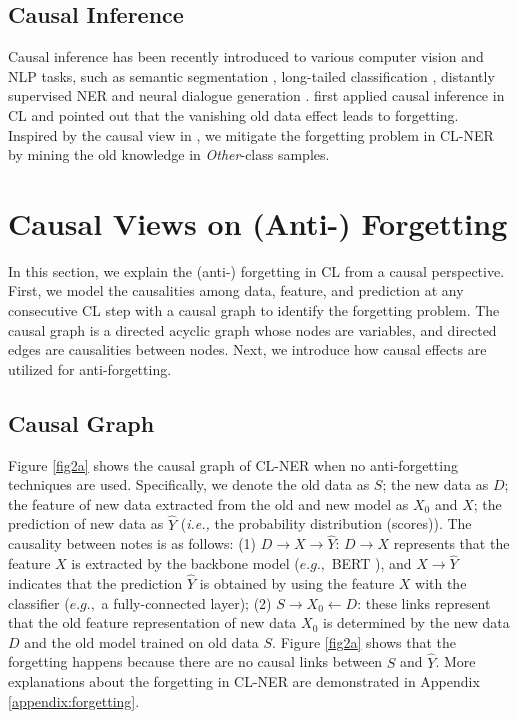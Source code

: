 \documentclass[11pt]{article}
\begin{document}
\subsection{Causal Inference}
Causal inference \citep{glymour2016causal,scholkopf2022causality} has been recently introduced to various computer vision and NLP tasks, such as semantic segmentation \citep{zhang2020causal}, long-tailed classification \citep{tang2020long,nan2021uncovering}, distantly supervised NER \citep{zhang2021biasing} and neural dialogue generation \citep{zhu2020counterfactual}.
\citet{hu2021distilling} first applied causal inference in CL and pointed out that the vanishing old data effect leads to forgetting.
Inspired by the causal view in \citep{hu2021distilling}, we mitigate the forgetting problem in CL-NER by mining the old knowledge in \textit{Other}-class samples.

\section{Causal Views on (Anti-) Forgetting}
In this section, we explain the (anti-) forgetting in CL from a causal perspective.
First, we model the causalities among data, feature, and prediction at any consecutive CL step with a causal graph \citep{pearl2009causality} to identify the forgetting problem.
The causal graph is a directed acyclic graph whose nodes are variables, and directed edges are causalities between nodes.
Next, we introduce how causal effects are utilized for anti-forgetting.

\subsection{Causal Graph}
Figure \ref{fig2a} shows the causal graph of CL-NER when no anti-forgetting techniques are used.
Specifically, we denote the old data as $S$; the new data as $D$; the feature of new data extracted from the old and new model as $X_0$ and $X$; the prediction of new data as $\hat{Y}$ (\textit{i.e.,} the probability distribution (scores)).
The causality between notes is as follows:
(1) $D \rightarrow X \rightarrow \hat{Y}$: $D \rightarrow X$ represents that the feature $X$ is extracted by the backbone model ($e.g.,$ BERT \citep{devlin-etal-2019-bert}), and $X \rightarrow \hat{Y}$ indicates that the prediction $\hat{Y}$ is obtained by using the feature $X$ with the classifier ($e.g.,$ a fully-connected layer);
(2) $S \rightarrow X_0 \leftarrow D$: these links represent that the old feature representation of new data $X_0$ is determined by the new data $D$ and the old model trained on old data $S$.
Figure \ref{fig2a} shows that the forgetting happens because there are no causal links between $S$ and $\hat{Y}$.
More explanations about the forgetting in CL-NER are demonstrated in Appendix \ref{appendix:forgetting}.
\end{document}
